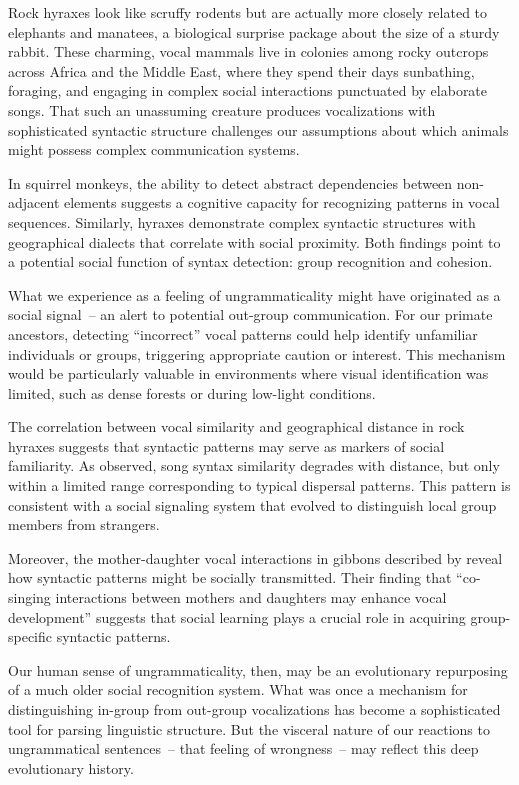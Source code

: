 Rock hyraxes look like scruffy rodents but are actually more closely related to elephants and manatees, a biological surprise package about the size of a sturdy rabbit. These charming, vocal mammals live in colonies among rocky outcrops across Africa and the Middle East, where they spend their days sunbathing, foraging, and engaging in complex social interactions punctuated by elaborate songs. That such an unassuming creature produces vocalizations with sophisticated syntactic structure challenges our assumptions about which animals might possess complex communication systems.

In squirrel monkeys, the ability to detect abstract dependencies between non-adjacent elements suggests a cognitive capacity for recognizing patterns in vocal sequences. Similarly, hyraxes demonstrate complex syntactic structures with geographical dialects that correlate with social proximity. Both findings point to a potential social function of syntax detection: group recognition and cohesion.

What we experience as a feeling of ungrammaticality might have originated as a social signal~-- an alert to potential out-group communication. For our primate ancestors, detecting ``incorrect'' vocal patterns could help identify unfamiliar individuals or groups, triggering appropriate caution or interest. This mechanism would be particularly valuable in environments where visual identification was limited, such as dense forests or during low-light conditions.

The correlation between vocal similarity and geographical distance in rock hyraxes suggests that syntactic patterns may serve as markers of social familiarity. As \citet{Kershenbaum2012} observed, song syntax similarity degrades with distance, but only within a limited range corresponding to typical dispersal patterns. This pattern is consistent with a social signaling system that evolved to distinguish local group members from strangers.

Moreover, the mother-daughter vocal interactions in gibbons described by \citet{Koda2013} reveal how syntactic patterns might be socially transmitted. Their finding that ``co-singing interactions between mothers and daughters may enhance vocal development'' suggests that social learning plays a crucial role in acquiring group-specific syntactic patterns.

Our human sense of ungrammaticality, then, may be an evolutionary repurposing of a much older social recognition system. What was once a mechanism for distinguishing in-group from out-group vocalizations has become a sophisticated tool for parsing linguistic structure. But the visceral nature of our reactions to ungrammatical sentences~-- that feeling of wrongness~-- may reflect this deep evolutionary history.

